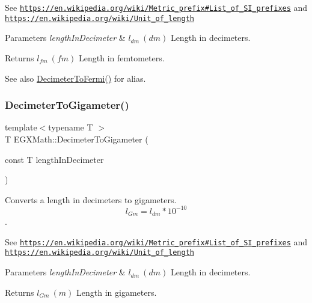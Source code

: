 See \href{https://en.wikipedia.org/wiki/Metric_prefix#List_of_SI_prefixes}{\tt https\+://en.\+wikipedia.\+org/wiki/\+Metric\+\_\+prefix\#\+List\+\_\+of\+\_\+\+S\+I\+\_\+prefixes} and \href{https://en.wikipedia.org/wiki/Unit_of_length}{\tt https\+://en.\+wikipedia.\+org/wiki/\+Unit\+\_\+of\+\_\+length} 
\begin{DoxyParams}{Parameters}
{\em length\+In\+Decimeter} & $ l_{dm}\ (dm)$ Length in decimeters. \\
\hline
\end{DoxyParams}
\begin{DoxyReturn}{Returns}
$ l_{fm}\ (fm)$ Length in femtometers. 
\end{DoxyReturn}
\begin{DoxySeeAlso}{See also}
\mbox{\hyperlink{group___e_g_x_math-_conversions-_length_conversions-_s_i-_decimeter-_non-_s_i_ga2163b07afe9c89c1a1150516f615ef2a}{Decimeter\+To\+Fermi()}} for alias. 
\end{DoxySeeAlso}
\mbox{\label{group___e_g_x_math-_conversions-_length_conversions-_s_i-_decimeter-_s_i_gab3fcc85ff18a685480d182d95da4d60b}} 
\subsubsection{\texorpdfstring{Decimeter\+To\+Gigameter()}{DecimeterToGigameter()}}
{\footnotesize\ttfamily template$<$typename T $>$ \\
T E\+G\+X\+Math\+::\+Decimeter\+To\+Gigameter (\begin{DoxyParamCaption}\item[{const T}]{length\+In\+Decimeter }\end{DoxyParamCaption})}



Converts a length in decimeters to gigameters. \[ l_{Gm}=l_{dm} * 10^{-10} \]. 

See \href{https://en.wikipedia.org/wiki/Metric_prefix#List_of_SI_prefixes}{\tt https\+://en.\+wikipedia.\+org/wiki/\+Metric\+\_\+prefix\#\+List\+\_\+of\+\_\+\+S\+I\+\_\+prefixes} and \href{https://en.wikipedia.org/wiki/Unit_of_length}{\tt https\+://en.\+wikipedia.\+org/wiki/\+Unit\+\_\+of\+\_\+length} 
\begin{DoxyParams}{Parameters}
{\em length\+In\+Decimeter} & $ l_{dm}\ (dm)$ Length in decimeters. \\
\hline
\end{DoxyParams}
\begin{DoxyReturn}{Returns}
$ l_{Gm}\ (m)$ Length in gigameters. 
\end{DoxyReturn}
\mbox{\label{group___e_g_x_math-_conversions-_length_conversions-_s_i-_decimeter-_s_i_gaa84a9ad8f41f664e41c4c390186dfa1b}} 

